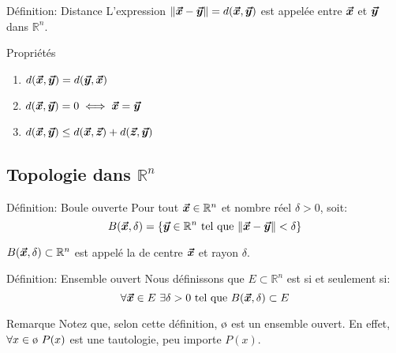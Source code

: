 \documentclass[a4paper]{article}
\begin{document}
\begin{parag}{Définition: Distance}
    L'expression $\left\|\bvec{x} - \bvec{y}\right\| = d\left(\bvec{x}, \bvec{y}\right)$ est appelée  entre $\bm{\protect\vec{x}}$ et $\bm{\protect\vec{y}}$ dans $\mathbb{R}^n$.

    \begin{subparag}{Propriétés}
        \begin{enumerate}[left=0pt]
            \item $d\left(\bvec{x}, \bvec{y}\right) = d\left(\bvec{y}, \bvec{x}\right)$
            \item $d\left(\bvec{x}, \bvec{y}\right) = 0 \iff \bvec{x} = \bvec{y}$
            \item $d\left(\bvec{x}, \bvec{y}\right) \leq d\left(\bvec{x}, \bvec{z}\right) + d\left(\bvec{z}, \bvec{y}\right)$
        \end{enumerate}
    \end{subparag}
\end{parag}

\subsection{Topologie dans $\mathbb{R}^n$}
\begin{parag}{Définition: Boule ouverte}
    Pour tout $\bm{\protect\vec{x}} \in \mathbb{R}^n$ et nombre réel $\delta > 0$, soit:
    \[B\left(\bvec{x}, \delta\right) = \left\{\bvec{y} \in\mathbb{R}^n \telque \left\|\bvec{x} - \bvec{y}\right\| < \delta\right\}\]

    $B\left(\bvec{x}, \delta\right) \subset \mathbb{R}^n$ est appelé la  de centre $\bm{\protect\vec{x}}$ et rayon $\delta$.

\end{parag}

\begin{parag}{Définition: Ensemble ouvert}
    Nous définissons que $E \subset \mathbb{R}^n$ est  si et seulement si:
    \[\forall \bvec{x}\in E\ \exists \delta > 0 \telque B\left(\bvec{x}, \delta\right) \subset E\]

    \begin{subparag}{Remarque}
        Notez que, selon cette définition, $\o$ est un ensemble ouvert. En effet, $\forall x \in \o\ P\left(x\right)$ est une tautologie, peu importe $P\left(x\right)$.
    \end{subparag}
\end{parag}
\end{document}
